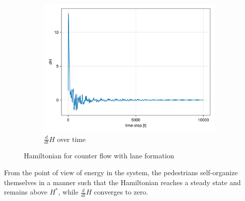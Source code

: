 \begin{itemize}
\begin{figure}[H]
\begin{subfigure}{.49\textwidth}
            \includegraphics[width=\linewidth]{figures/ch5_collective/dH_counter.png}
            \caption{$\frac{d}{dt}H$ over time}
            \label{plot:counter_dh}
        \end{subfigure}
        \caption{Hamiltonian for counter flow with lane formation}
        \label{plot:counter_hamiltonian}
    \end{figure}
From the point of view of energy in the system, the pedestrians self-organize themselves in a manner such that the Hamiltonian reaches a steady state and remains above $H^*$, while $\frac{d}{dt}H$ converges to zero. 


\end{itemize}
